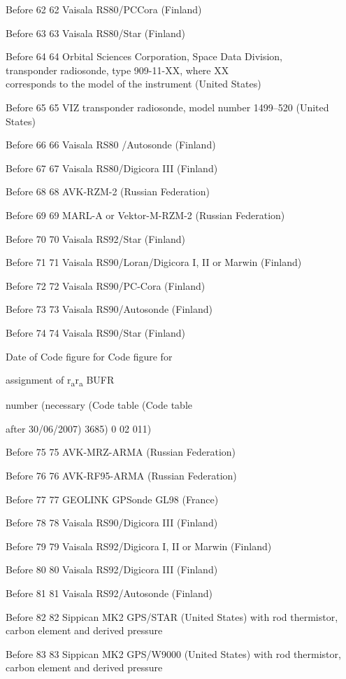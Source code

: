 Before 62 62 Vaisala RS80/PCCora (Finland)

Before 63 63 Vaisala RS80/Star (Finland)

Before 64 64 Orbital Sciences Corporation, Space Data Division,\\
transponder radiosonde, type 909-11-XX, where XX\\
corresponds to the model of the instrument (United States)

Before 65 65 VIZ transponder radiosonde, model number 1499--520 (United\\
States)

Before 66 66 Vaisala RS80 /Autosonde (Finland)

Before 67 67 Vaisala RS80/Digicora III (Finland)

Before 68 68 AVK-RZM-2 (Russian Federation)

Before 69 69 MARL-A or Vektor-M-RZM-2 (Russian Federation)

Before 70 70 Vaisala RS92/Star (Finland)

Before 71 71 Vaisala RS90/Loran/Digicora I, II or Marwin (Finland)

Before 72 72 Vaisala RS90/PC-Cora (Finland)

Before 73 73 Vaisala RS90/Autosonde (Finland)

Before 74 74 Vaisala RS90/Star (Finland)

Date of Code figure for Code figure for

assignment of r\textsubscript{a}r\textsubscript{a} BUFR

number (necessary (Code table (Code table

after 30/06/2007) 3685) 0 02 011)

Before 75 75 AVK-MRZ-ARMA (Russian Federation)

Before 76 76 AVK-RF95-ARMA (Russian Federation)

Before 77 77 GEOLINK GPSonde GL98 (France)

Before 78 78 Vaisala RS90/Digicora III (Finland)

Before 79 79 Vaisala RS92/Digicora I, II or Marwin (Finland)

Before 80 80 Vaisala RS92/Digicora III (Finland)

Before 81 81 Vaisala RS92/Autosonde (Finland)

Before 82 82 Sippican MK2 GPS/STAR (United States) with rod thermistor,\\
carbon element and derived pressure

Before 83 83 Sippican MK2 GPS/W9000 (United States) with rod thermistor,\\
carbon element and derived pressure

